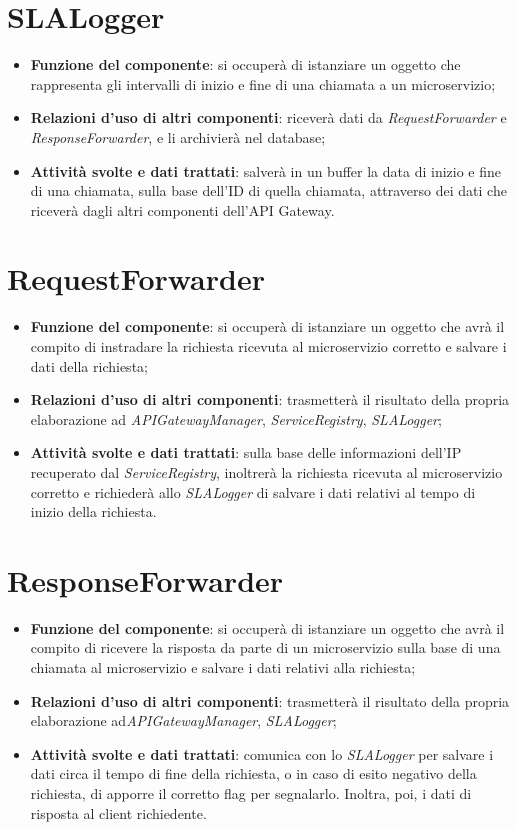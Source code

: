 \chapter{\textbf{SLALogger}}
\begin{itemize}
	\item \textbf{Funzione del componente}: si occuperà di istanziare un oggetto che rappresenta gli intervalli di inizio e fine di una chiamata a un microservizio;
	\item \textbf{Relazioni d'uso di altri componenti}: riceverà dati da \textit{RequestForwarder} e \textit{ResponseForwarder}, e li archivierà nel database;
	\item \textbf{Attività svolte e dati trattati}: salverà in un buffer la data di inizio e fine di una chiamata, sulla base dell'ID di quella chiamata, attraverso dei dati che riceverà dagli altri componenti dell'API Gateway.	
\end{itemize}

\chapter{\textbf{RequestForwarder}}
\begin{itemize}
	\item \textbf{Funzione del componente}: si occuperà di istanziare un oggetto che avrà il compito di instradare la richiesta ricevuta al microservizio corretto e salvare i dati della richiesta;
		\item \textbf{Relazioni d'uso di altri componenti}: trasmetterà il risultato della propria elaborazione ad \textit{APIGatewayManager}, \textit{ServiceRegistry}, \textit{SLALogger};
		\item \textbf{Attività svolte e dati trattati}: sulla base delle informazioni dell'IP recuperato dal \textit{ServiceRegistry}, inoltrerà la richiesta ricevuta al microservizio corretto e richiederà allo \textit{SLALogger} di salvare i dati relativi al tempo di inizio della richiesta.
\end{itemize}

\chapter{\textbf{ResponseForwarder}}
\begin{itemize}
	\item \textbf{Funzione del componente}: si occuperà di istanziare un oggetto che avrà il compito di ricevere la risposta da parte di un microservizio sulla base di una chiamata al microservizio e salvare i dati relativi alla richiesta;
	\item \textbf{Relazioni d'uso di altri componenti}: trasmetterà il risultato della propria elaborazione ad\textit{APIGatewayManager}, \textit{SLALogger};
	\item \textbf{Attività svolte e dati trattati}: comunica con lo \textit{SLALogger} per salvare i dati circa il tempo di fine della richiesta, o in caso di esito negativo della richiesta, di apporre il corretto flag per segnalarlo. Inoltra, poi, i dati di risposta al client richiedente.
\end{itemize}

